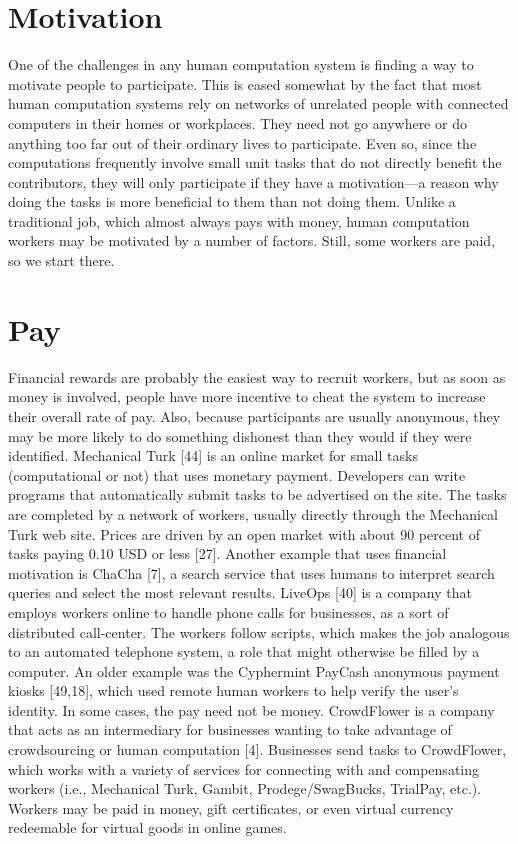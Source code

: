\documentclass{acm_proc_article-sp} %
\begin{document}
\section{Motivation} One of the challenges in any human computation system is finding a way to motivate people to participate. This is eased somewhat by the fact that most human computation systems rely on networks of unrelated people with connected computers in their homes or workplaces. They need not go anywhere or do anything too far out of their ordinary lives to participate. Even so, since the computations frequently involve small unit tasks that do not directly benefit the contributors, they will only participate if they have a motivation—a reason why doing the tasks is more beneficial to them than not doing them. Unlike a traditional job, which almost always pays with money, human computation workers may be motivated by a number of factors. Still, some workers are paid, so we start there.

\section{Pay} Financial rewards are probably the easiest way to recruit workers, but as soon as money is involved, people have more incentive to cheat the system to increase their overall rate of pay. Also, because participants are usually anonymous, they may be more likely to do something dishonest than they would if they were identified.  Mechanical Turk [44] is an online market for small tasks (computational or not) that uses monetary payment. Developers can write programs that automatically submit tasks to be advertised on the site. The tasks are completed by a network of workers, usually directly through the Mechanical Turk web site. Prices are driven by an open market with about 90 percent of tasks paying 0.10 USD or less [27]. Another example that uses financial motivation is ChaCha [7], a search service that uses humans to interpret search queries and select the most relevant results. LiveOps [40] is a company that employs workers online to handle phone calls for businesses, as a sort of distributed call-center. The workers follow scripts, which makes the job analogous to an automated telephone system, a role that might otherwise be filled by a computer. An older example was the Cyphermint PayCash anonymous payment kiosks [49,18], which used remote human workers to help verify the user's identity. In some cases, the pay need not be money.  CrowdFlower is a company that acts as an intermediary for businesses wanting to take advantage of crowdsourcing or human computation [4]. Businesses send tasks to CrowdFlower, which works with a variety of services for connecting with and compensating workers (i.e., Mechanical Turk, Gambit, Prodege/SwagBucks, TrialPay, etc.).  Workers may be paid in money, gift certificates, or even virtual currency redeemable for virtual goods in online games.
\end{document}
